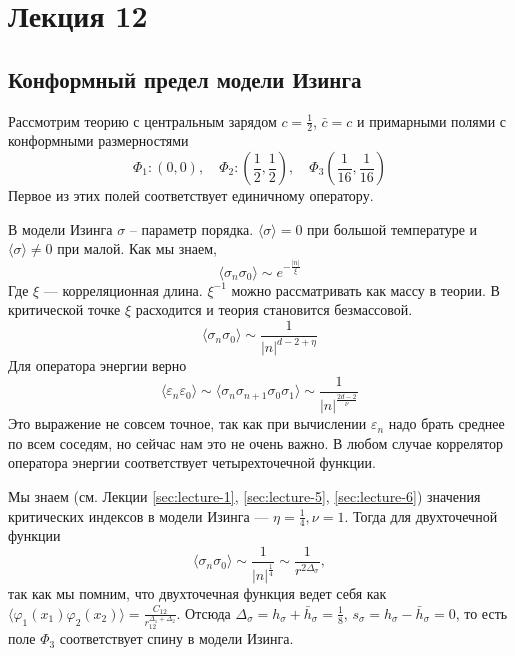 \documentclass[a4paper,12pt]{article}
\theoremstyle{definition}
\theoremstyle{definition}
\theoremstyle{definition}
\begin{document}
\section{Лекция 12}
\label{sec:lecture-12}

\subsection{Конформный предел модели Изинга}
\label{sec:ising-conformal-limit}

Рассмотрим теорию с центральным зарядом $c=\frac{1}{2}$, $\bar c=c$ и примарными полями с конформными размерностями
\begin{equation}
  \label{eq:276}
  \Phi_{1}: (0,0),\quad \Phi_{2}: \left(\frac{1}{2},\frac{1}{2}\right),\quad \Phi_{3}\left(\frac{1}{16},\frac{1}{16}\right)
\end{equation}
Первое из этих полей соответствует единичному оператору. 

В модели Изинга $\sigma$ -- параметр порядка. $\langle\sigma\rangle=0$ при большой температуре и $\langle \sigma\rangle\neq 0$ при малой. Как мы знаем,
\begin{equation}
  \label{eq:277}
  \langle \sigma_{n} \sigma_{0}\rangle\sim e^{-\frac{|n|}{\xi}}
\end{equation}
Где $\xi$ --- корреляционная длина. $\xi^{-1}$ можно рассматривать как массу в теории. В критической точке $\xi$ расходится и теория становится безмассовой.
\begin{equation}
  \label{eq:278}
  \langle\sigma_{n}\sigma_{0}\rangle\sim\frac{1}{|n|^{d-2+\eta}}
\end{equation}
Для оператора энергии верно
\begin{equation}
  \label{eq:279}
  \langle \varepsilon_{n} \varepsilon_{0}\rangle \sim \langle\sigma_{n}\sigma_{n+1}\sigma_{0}\sigma_{1}\rangle\sim\frac{1}{|n|^{\frac{2d-2}{\nu}}}
\end{equation}
Это выражение не совсем точное, так как при вычислении $\varepsilon_{n}$ надо брать среднее по всем соседям, но сейчас нам это не очень важно. В любом случае коррелятор оператора энергии соответствует четырехточечной функции. 

Мы знаем (см. Лекции \ref{sec:lecture-1}, \ref{sec:lecture-5}, \ref{sec:lecture-6}) значения критических индексов в модели Изинга --- $\eta=\frac{1}{4}, \nu=1$. Тогда для двухточечной функции
\begin{equation}
  \label{eq:280}
  \langle \sigma_{n} \sigma_{0} \rangle\sim \frac{1}{|n|^{\frac{1}{4}}} \sim\frac{1}{r^{2\Delta_{\sigma}}},
\end{equation}
так как мы помним, что двухточечная функция ведет себя как $\langle \varphi_{1}(x_{1}) \varphi_{2}(x_{2})\rangle=\frac{C_{12}}{r_{12}^{\Delta_{1}+\Delta_{2}}}$. Отсюда $\Delta_{\sigma}=h_{\sigma}+\bar h_{\sigma}=\frac{1}{8}$, $s_{\sigma}=h_{\sigma}-\bar h_{\sigma}=0$, то есть поле $\Phi_{3}$ соответствует спину в модели Изинга. 
\end{document}
